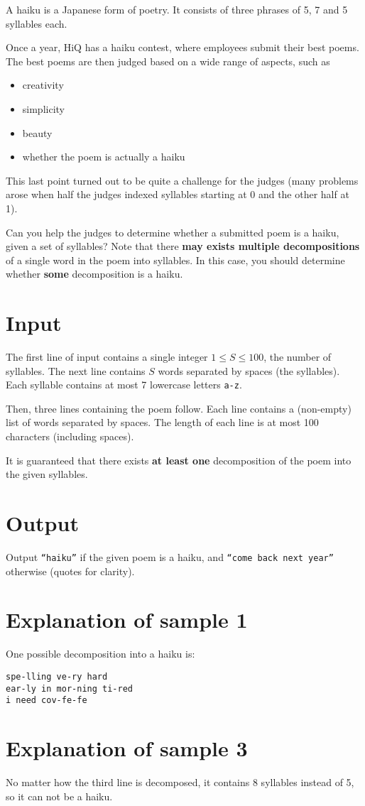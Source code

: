 A haiku is a Japanese form of poetry.
It consists of three phrases of 5, 7 and 5 syllables each.

Once a year, HiQ has a haiku contest, where employees submit their best poems.
The best poems are then judged based on a wide range of aspects, such as
\begin{itemize}
    \item creativity
    \item simplicity
    \item beauty
    \item whether the poem is actually a haiku
\end{itemize}
This last point turned out to be quite a challenge for the judges (many problems arose when half the judges indexed syllables starting at 0 and the other half at 1).

Can you help the judges to determine whether a submitted poem is a haiku, given a set of syllables?
Note that there \textbf{may exists multiple decompositions} of a single word in the poem into syllables.
In this case, you should determine whether \textbf{some} decomposition is a haiku.

\section*{Input}
The first line of input contains a single integer $1 \le S \le 100$, the number of syllables.
The next line contains $S$ words separated by spaces (the syllables).
Each syllable contains at most 7 lowercase letters \texttt{a-z}.

Then, three lines containing the poem follow.
Each line contains a (non-empty) list of words separated by spaces.
The length of each line is at most 100 characters (including spaces).

It is guaranteed that there exists \textbf{at least one} decomposition of the poem into the given syllables.

\section*{Output}
Output \texttt{``haiku''} if the given poem is a haiku, and \texttt{``come back next year''} otherwise (quotes for clarity).

\section*{Explanation of sample 1}
One possible decomposition into a haiku is:
\begin{verbatim}
spe-lling ve-ry hard
ear-ly in mor-ning ti-red
i need cov-fe-fe
\end{verbatim}

\section*{Explanation of sample 3}
No matter how the third line is decomposed, it contains 8 syllables instead of 5, so it can not be a haiku.
